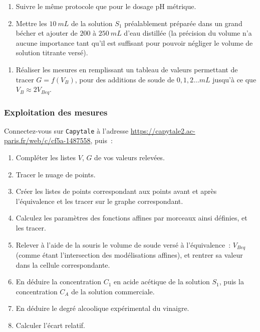 \documentclass[a4paper, 10pt, final, garamond]{book}
\begin{document}
\begin{enumerate}
    \item Suivre le même protocole que pour le dosage pH métrique. 
    \item Mettre les $\SI{10}{mL}$ de la solution $S_1$ préalablement préparée
        dans un grand bécher et ajouter de $200$ à $\SI{250}{mL}$ d'eau
        distillée (la précision du volume n'a aucune importance tant qu'il est
        suffisant pour pouvoir négliger le volume de solution titrante versé).
\end{enumerate}
\begin{enumerate}[label=\sqenumi, start=11]
    \item Réaliser les mesures en remplissant un tableau de valeurs permettant
        de tracer $G = f (V_B)$, pour des additions de soude de $0,1,2… \si{mL}$
        jusqu'à ce que $V_B \approx 2 V_{Beq}$.
\end{enumerate}

\subsubsection{Exploitation des mesures}

Connectez-vous sur \texttt{Capytale} à l'adresse \url{https://capytale2.ac-paris.fr/web/c/cf5a-1487558}, puis~:

\begin{enumerate}
    \item Compléter les listes $V$, $G$ de vos valeurs relevées. 
    \item Tracer le nuage de points.
    \item Créer les listes de points correspondant aux points avant et après
        l'équivalence et les tracer sur le graphe correspondant.
    \item Calculez les paramètres des fonctions affines par morceaux ainsi
        définies, et les tracer.
    \item Relever à l'aide de la souris le volume de soude
        versé à l'équivalence~: $V_{Beq}$ (comme étant l'intersection des
        modélisations affines), et rentrer sa valeur dans la cellule
        correspondante.
    \item En déduire la concentration $C_1$ en acide acétique de la solution
        $S_1$, puis la concentration $C_A$ de la solution commerciale.
    \item En déduire le degré alcoolique expérimental du vinaigre.
    \item Calculer l'écart relatif.
\end{enumerate}
\end{document}
